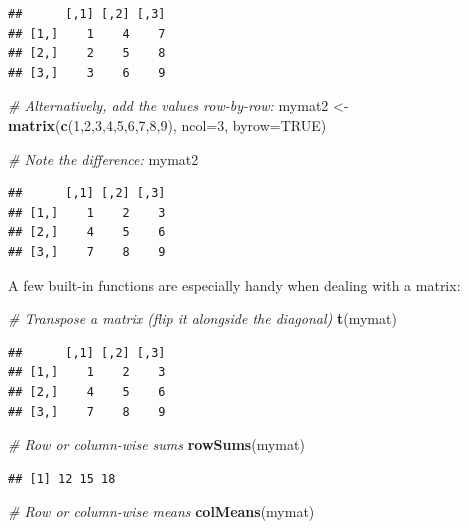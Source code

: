\documentclass[]{book}
\newenvironment{Shaded}{\begin{snugshade}}{\end{snugshade}}
\newcommand{\CommentTok}[1]{\textcolor[rgb]{0.56,0.35,0.01}{\textit{#1}}}
\newcommand{\DataTypeTok}[1]{\textcolor[rgb]{0.13,0.29,0.53}{#1}}
\newcommand{\DecValTok}[1]{\textcolor[rgb]{0.00,0.00,0.81}{#1}}
\newcommand{\KeywordTok}[1]{\textcolor[rgb]{0.13,0.29,0.53}{\textbf{#1}}}
\newcommand{\NormalTok}[1]{#1}
\newcommand{\OtherTok}[1]{\textcolor[rgb]{0.56,0.35,0.01}{#1}}
\newcommand{\StringTok}[1]{\textcolor[rgb]{0.31,0.60,0.02}{#1}}
\begin{document}
\begin{verbatim}
##      [,1] [,2] [,3]
## [1,]    1    4    7
## [2,]    2    5    8
## [3,]    3    6    9
\end{verbatim}

\begin{Shaded}
\begin{Highlighting}[]
\CommentTok{# Alternatively, add the values row-by-row:}
\NormalTok{mymat2 <-}\StringTok{ }\KeywordTok{matrix}\NormalTok{(}\KeywordTok{c}\NormalTok{(}\DecValTok{1}\NormalTok{,}\DecValTok{2}\NormalTok{,}\DecValTok{3}\NormalTok{,}\DecValTok{4}\NormalTok{,}\DecValTok{5}\NormalTok{,}\DecValTok{6}\NormalTok{,}\DecValTok{7}\NormalTok{,}\DecValTok{8}\NormalTok{,}\DecValTok{9}\NormalTok{), }\DataTypeTok{ncol=}\DecValTok{3}\NormalTok{,  }\DataTypeTok{byrow=}\OtherTok{TRUE}\NormalTok{)}

\CommentTok{# Note the difference:}
\NormalTok{mymat2}
\end{Highlighting}
\end{Shaded}

\begin{verbatim}
##      [,1] [,2] [,3]
## [1,]    1    2    3
## [2,]    4    5    6
## [3,]    7    8    9
\end{verbatim}

A few built-in functions are especially handy when dealing with a matrix:

\begin{Shaded}
\begin{Highlighting}[]
\CommentTok{# Transpose a matrix (flip it alongside the diagonal)}
\KeywordTok{t}\NormalTok{(mymat)}
\end{Highlighting}
\end{Shaded}

\begin{verbatim}
##      [,1] [,2] [,3]
## [1,]    1    2    3
## [2,]    4    5    6
## [3,]    7    8    9
\end{verbatim}

\begin{Shaded}
\begin{Highlighting}[]
\CommentTok{# Row or column-wise sums}
\KeywordTok{rowSums}\NormalTok{(mymat)}
\end{Highlighting}
\end{Shaded}

\begin{verbatim}
## [1] 12 15 18
\end{verbatim}

\begin{Shaded}
\begin{Highlighting}[]
\CommentTok{# Row or column-wise means}
\KeywordTok{colMeans}\NormalTok{(mymat)}
\end{Highlighting}
\end{Shaded}
\end{document}
